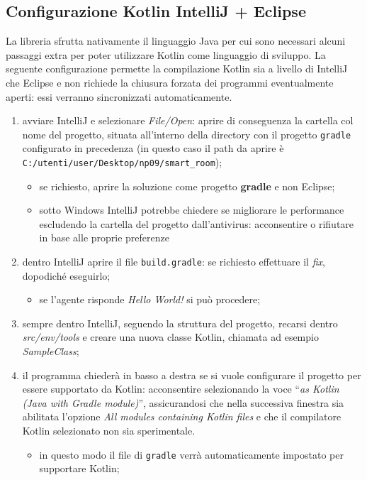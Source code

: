 \documentclass[12pt,a4paper,openright,oneside]{report}
\newcommand{\quotes}[1]{``#1''}
\begin{document}
\subsection{Configurazione Kotlin IntelliJ + Eclipse}
La libreria sfrutta nativamente il linguaggio Java per cui sono necessari alcuni passaggi extra per poter utilizzare Kotlin come linguaggio di sviluppo. La seguente configurazione permette la compilazione Kotlin sia a livello di IntelliJ che Eclipse e non richiede la chiusura forzata dei programmi eventualmente aperti: essi verranno sincronizzati automaticamente.

\begin{enumerate}
	\item avviare IntelliJ e selezionare \textit{File/Open}: aprire di conseguenza la cartella col nome del progetto, situata all'interno della directory con il progetto \texttt{gradle} configurato in precedenza (in questo caso il path da aprire è  \texttt{C:/utenti/user/Desktop/np09/smart\_room});
	
	\begin{itemize}
		\item se richiesto, aprire la soluzione come progetto \textbf{gradle} e non Eclipse;
		
		\item sotto Windows IntelliJ potrebbe chiedere se migliorare le performance escludendo la cartella del progetto dall'antivirus: acconsentire o rifiutare in base alle proprie preferenze
	\end{itemize}

	\item dentro IntelliJ aprire il file \texttt{build.gradle}: se richiesto effettuare il \textit{fix}, dopodiché eseguirlo;
	\begin{itemize}
		\item se l'agente risponde \textit{Hello World!} si può procedere;
	\end{itemize}

	\item sempre dentro IntelliJ, seguendo la struttura del progetto, recarsi dentro \textit{src/env/tools} e creare una nuova classe Kotlin, chiamata ad esempio \textit{SampleClass};
	
	\item il programma chiederà in basso a destra se si vuole configurare il progetto per essere supportato da Kotlin: acconsentire selezionando la voce \quotes{\textit{as Kotlin (Java with Gradle module)}}, assicurandosi che nella successiva finestra sia abilitata l'opzione \textit{All modules containing Kotlin files} e che il compilatore Kotlin selezionato non sia sperimentale.
	\begin{itemize}
		\item in questo modo il file di \texttt{gradle} verrà automaticamente impostato per supportare Kotlin;
	\end{itemize}


\end{enumerate}
\end{document}
